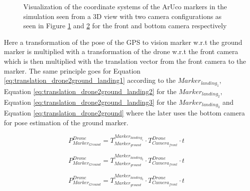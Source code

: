 \documentclass[../Head/report.tex]{subfiles}
\begin{document}
\begin{figure}[H]
    \centering
    \begin{subfigure}[t]{.48\textwidth}
        \centering
\scalebox{1.0}{}
		\caption{}
        \label{fig:3d_view_aruco_front_camera}
    \end{subfigure}
    \hfill
    \begin{subfigure}[t]{.48\textwidth}
        \centering
\scalebox{1.0}{}
        \caption{}
        \label{fig:3d_view_aruco_bottom_camera}
    \end{subfigure}
    \caption{Visualization of the coordinate systems of the ArUco markers in the simulation seen from a 3D view with two camera configurations as seen in Figure \ref{fig:3d_view_aruco_front_camera} and \ref{fig:3d_view_aruco_bottom_camera} for the front and bottom camera respectively}
    \label{fig:3d_view_aruco_coordinate_systems}
\end{figure}

Here a transformation of the pose of the GPS to vision marker w.r.t the ground marker is multiplied with a transformation of the drone w.r.t the front camera which is then multiplied with the translation vector from the front camera to the marker. The same principle goes for Equation \ref{eq:translation_drone2ground_landing1} according to the $Marker_{landing_1}$, Equation \ref{eq:translation_drone2ground_landing2} for the $Marker_{landing_2}$, Equation  \ref{eq:translation_drone2ground_landing3} for the  $Marker_{landing_3}$ and Equation \ref{eq:translation_drone2ground} where the later uses the bottom camera for pose estimation of the ground marker.   


\begin{equation}
	P^{Drone}_{Marker_{Ground}} = T^{Marker_{landing_1}}_{Marker_{ground}} \cdot T^{Drone}_{Camera_{front}} \cdot t
	\label{eq:translation_drone2ground_landing1}   
\end{equation}       

\begin{equation}
	P^{Drone}_{Marker_{Ground}} = T^{Marker_{landing_2}}_{Marker_{ground}} \cdot T^{Drone}_{Camera_{front}} \cdot t
	\label{eq:translation_drone2ground_landing2} 
\end{equation} 

\begin{equation}
	P^{Drone}_{Marker_{Ground}} = T^{Marker_{landing_3}}_{Marker_{ground}} \cdot T^{Drone}_{Camera_{front}} \cdot t
	\label{eq:translation_drone2ground_landing3}   
\end{equation} 
\end{document}
